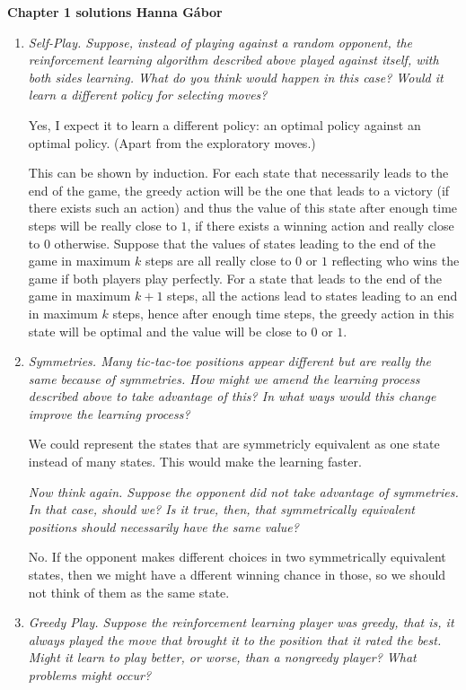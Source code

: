 \documentclass[12pt,a4paper]{article}
\begin{document}
\textbf{Chapter 1 solutions  \hfill Hanna Gábor}\\

\begin{enumerate}
  \item
    \textit{Self-Play. Suppose, instead of playing against a random opponent, the reinforcement learning algorithm described above played against itself, with both sides learning. What do you think would happen in this case? Would it learn a different policy for selecting moves?}

    Yes, I expect it to learn a different policy: an optimal policy against an optimal policy. (Apart from the exploratory moves.)

    This can be shown by induction. For each state that necessarily leads to the end of the game, the greedy action will be the one that leads to a victory (if there exists such an action) and thus the value of this state after enough time steps will be really close to $1$, if there exists a winning action and really close to $0$ otherwise. Suppose that the values of states leading to the end of the game in maximum $k$ steps are all really close to $0$ or $1$ reflecting who wins the game if both players play perfectly. For a state that leads to the end of the game in maximum $k + 1$ steps, all the actions lead to states leading to an end in maximum $k$ steps, hence after enough time steps, the greedy action in this state will be optimal and the value will be close to $0$ or $1$.

   \item
     \textit{Symmetries. Many tic-tac-toe positions appear different but are really the same because of symmetries. How might we amend the learning process described above to take advantage of this? In what ways would this change improve the learning process?}

     We could represent the states that are symmetricly equivalent as one state instead of many states. This would make the learning faster.

     \textit{Now think again. Suppose the opponent did not take advantage of symmetries. In that case, should we? Is it true, then, that symmetrically equivalent positions should necessarily have the same value?}

      No. If the opponent makes different choices in two symmetrically equivalent states, then we might have a dfferent winning chance in those, so we should not think of them as the same state.

  \item
    \textit{Greedy Play. Suppose the reinforcement learning player was greedy, that is, it always played the move that brought it to the position that it rated the best. Might it  learn to play better, or worse, than a nongreedy player? What problems might occur?}


\end{enumerate}
\end{document}
